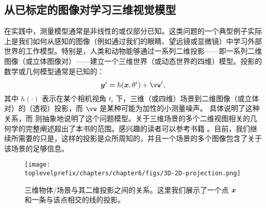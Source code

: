 \documentclass[../../book-main.tex]{subfiles}
\begin{document}



\subsection{从已标定的图像对学习三维视觉模型}
在实践中，测量模型通常是非线性的或仅部分已知。这类问题的一个典型例子实际上是我们如何从感知的图像（例如通过我们的眼睛、望远镜或显微镜）中学习外部世界的工作模型。特别是，人类和动物能够通过一系列二维投影——即一系列二维图像（或立体图像对）——建立一个三维世界（或动态世界的四维）模型。投影的数学或几何模型通常是已知的：
\begin{equation}
    \y^i = h(\x, \theta^i) +\vw^{i}, 
\end{equation}
其中 $h(\cdot)$ 表示在某个相机视角 $t_i$ 下，三维（或四维）场景到二维图像（或立体对）的（透视）投影，而 $\vw$ 是某种可能为加性的小测量噪声。 具体说明了这种关系，而  则抽象地说明了这个问题模型。关于三维场景的多个二维视图相关的几何学的完整阐述超出了本书的范围。感兴趣的读者可以参考书籍 \cite{MaY2003}。目前，我们继续所需要的只是，这样的投影是众所周知的，并且一个场景的多个图像包含了关于该场景的足够信息。
\begin{figure}[t]
    \centering
    \texttt{[image: \\toplevelprefix/chapters/chapter6/figs/3D-2D-projection.png]}
    \caption{三维物体/场景与其二维投影之间的关系。这里我们展示了一个点 $\bm{x}$ 和一条与该点相交的线的投影。}
    \label{fig:projection-2D}
\end{figure}
\end{document}
